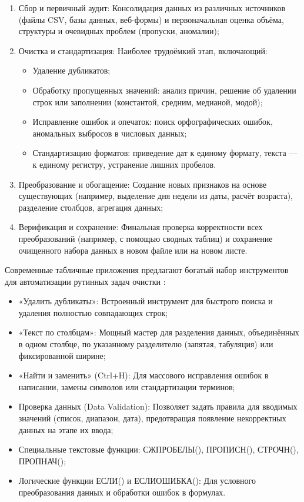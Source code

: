 \documentclass{SibFU-docs}
\begin{document}
\begin{enumerate}
    \item Сбор и первичный аудит: Консолидация данных из различных источников (файлы CSV, базы данных, веб-формы) и первоначальная оценка объёма, структуры и очевидных проблем (пропуски, аномалии);
    \item Очистка и стандартизация: Наиболее трудоёмкий этап, включающий:
        \begin{itemize}[label=-]
            \item Удаление дубликатов;
            \item Обработку пропущенных значений: анализ причин, решение об удалении строк или заполнении (константой, средним, медианой, модой);
            \item Исправление ошибок и опечаток: поиск орфографических ошибок, аномальных выбросов в числовых данных;
            \item Стандартизацию форматов: приведение дат к единому формату, текста --- к единому регистру, устранение лишних пробелов.
        \end{itemize}
    \item Преобразование и обогащение: Создание новых признаков на основе существующих (например, выделение дня недели из даты, расчёт возраста), разделение столбцов, агрегация данных;
    \item Верификация и сохранение: Финальная проверка корректности всех преобразований (например, с помощью сводных таблиц) и сохранение очищенного набора данных в новом файле или на новом листе.
\end{enumerate}


Современные табличные приложения предлагают богатый набор инструментов для автоматизации рутинных задач очистки \cite{microsoft2024powerquery, googlesupport2024sheets}:

\begin{itemize}[label=-]
    \item «Удалить дубликаты»: Встроенный инструмент для быстрого поиска и удаления полностью совпадающих строк;
    \item «Текст по столбцам»: Мощный мастер для разделения данных, объединённых в одном столбце, по указанному разделителю (запятая, табуляция) или фиксированной ширине;
    \item «Найти и заменить» (Ctrl+H): Для массового исправления ошибок в написании, замены символов или стандартизации терминов;
    \item Проверка данных (Data Validation): Позволяет задать правила для вводимых значений (список, диапазон, дата), предотвращая появление некорректных данных на этапе их ввода;
    \item Специальные текстовые функции: СЖПРОБЕЛЫ(), ПРОПИСН(), СТРОЧН(), ПРОПНАЧ();
    \item Логические функции ЕСЛИ() и ЕСЛИОШИБКА(): Для условного преобразования данных и обработки ошибок в формулах.
\end{itemize}
\end{document}
